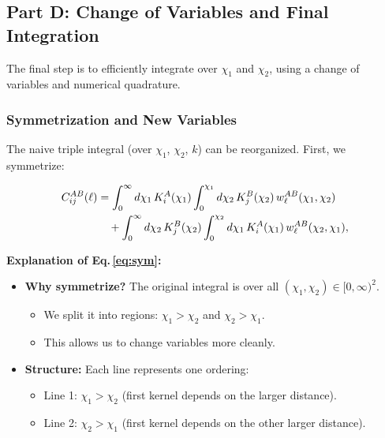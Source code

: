 \subsection{Part D: Change of Variables and Final Integration}

The final step is to efficiently integrate over $\chi_1$ and $\chi_2$, using a change of variables and numerical quadrature.

\subsubsection{Symmetrization and New Variables}

The naive triple integral (over $\chi_1$, $\chi_2$, $k$) can be reorganized. First, we symmetrize:

\begin{align}
    C^{AB}_{ij}(\ell) &=
    \int_0^\infty d\chi_1\, K^A_i(\chi_1)
    \int_0^{\chi_1} d\chi_2\, K^B_j(\chi_2)\, w^{AB}_\ell(\chi_1,\chi_2) \notag\\
    &\quad +
    \int_0^\infty d\chi_2\, K^B_j(\chi_2)
    \int_0^{\chi_2} d\chi_1\, K^A_i(\chi_1)\, w^{AB}_\ell(\chi_2,\chi_1),
    \label{eq:sym}
\end{align}

\noindent\textbf{\large Explanation of Eq.\,\eqref{eq:sym}:}\\

\begin{itemize}[leftmargin=1.5cm]
    \item \textbf{Why symmetrize?} The original integral is over all $(\chi_1, \chi_2) \in [0,\infty)^2$. 
    \begin{itemize}
        \item We split it into regions: $\chi_1 > \chi_2$ and $\chi_2 > \chi_1$.
        \item This allows us to change variables more cleanly.
    \end{itemize}
    
    \item \textbf{Structure:} Each line represents one ordering:
    \begin{itemize}
        \item Line 1: $\chi_1 > \chi_2$ (first kernel depends on the larger distance).
        \item Line 2: $\chi_2 > \chi_1$ (first kernel depends on the other larger distance).
    \end{itemize}
\end{itemize}

